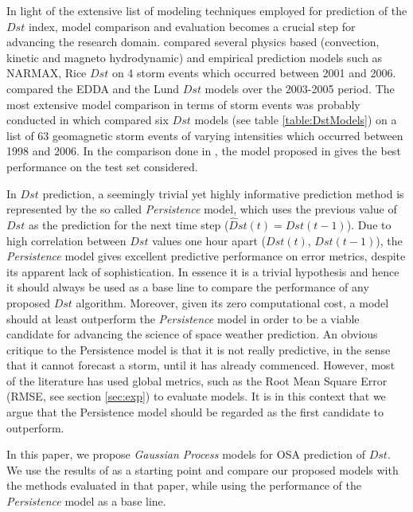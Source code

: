 \documentclass[referee,a4paper,12pt,traditabstract]{swsc}
\begin{document}
\begin{linenumbers}
In light of the extensive list of modeling techniques employed for prediction of the $Dst$ index, model comparison and evaluation becomes a crucial step for advancing the research domain. \citet{Rastatter2013} compared several physics based (convection, kinetic and magneto hydrodynamic) and empirical prediction models such as NARMAX, Rice $Dst$ on 4 storm events which occurred between 2001 and 2006. \citet{Amata2008} compared the EDDA and the Lund $Dst$ models over the 2003-2005 period. The most extensive model comparison in terms of storm events was probably conducted in \citet{Ji2012} which compared six $Dst$ models (see table \ref{table:DstModels}) on a list of 63 geomagnetic storm events of varying intensities which occurred between 1998 and 2006. In the comparison done in \citet{Ji2012}, the model proposed in \citet{JGRA:JGRA16300} gives the best performance on the test set considered. 

In $Dst$ prediction, a seemingly trivial yet highly informative prediction method is represented by the so called \emph{Persistence} model, which uses the previous value of $Dst$ as the prediction for the next time step ($\hat{D}st(t) = Dst(t-1)$). Due to high correlation between $Dst$ values one hour apart ($Dst(t)$, $Dst(t-1)$), the \emph{Persistence} model gives excellent predictive performance on error metrics, despite its apparent lack of sophistication. In essence it is a trivial hypothesis and hence it should always be used as a base line to compare the performance of any proposed $Dst$ algorithm. Moreover, given its zero computational cost, a model should at least outperform the \emph{Persistence} model in order to be a viable candidate for advancing the science of space weather prediction. An obvious critique to the Persistence model is that it is not really predictive, in the sense that it cannot forecast a storm, until it has already commenced. However, most of the literature has used global metrics, such as the Root Mean Square Error (RMSE, see section \ref{sec:exp}) to evaluate models. It is in this context that we argue that the Persistence model should be regarded as the first candidate to outperform.

In this paper, we propose \emph{Gaussian Process} models for OSA prediction of $Dst$. We use the results of \citet{Ji2012} as a starting point and compare our proposed models with the methods evaluated in that paper, while using the performance of the \emph{Persistence} model as a base line. 


\end{linenumbers}
\end{document}
